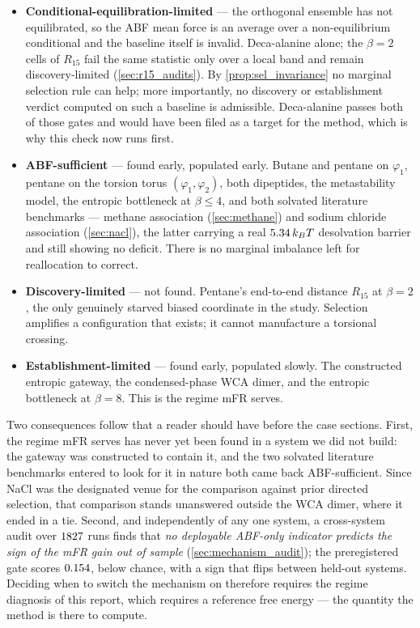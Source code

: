 \begin{itemize}
  \item \textbf{Conditional-equilibration-limited} --- the orthogonal ensemble has not
  equilibrated, so the ABF mean force is an average over a non-equilibrium conditional and the
  baseline itself is invalid. Deca-alanine alone; the $\beta=2$ cells of $R_{15}$ fail the
  same statistic only over a local band and remain discovery-limited (\cref{sec:r15_audits}).
  By
  \cref{prop:sel_invariance} no marginal selection rule can help; more importantly, no
  discovery or establishment verdict computed on such a baseline is admissible. Deca-alanine
  passes both of those gates and would have been filed as a target for the method, which is
  why this check now runs first.
  \item \textbf{ABF-sufficient} --- found early, populated early. Butane and pentane on
  $\varphi_1$, pentane on the torsion torus $(\varphi_1,\varphi_2)$, both dipeptides, the
  metastability model, the entropic bottleneck at $\beta\le4$, and both solvated
  literature benchmarks --- methane association (\cref{sec:methane}) and sodium chloride
  association (\cref{sec:nacl}), the latter carrying a real $5.34\,k_BT$ desolvation
  barrier and still showing no deficit. There is no marginal
  imbalance left for reallocation to correct.
  \item \textbf{Discovery-limited} --- not found. Pentane's end-to-end distance $R_{15}$ at
  $\beta=2$, the only genuinely starved biased coordinate in the study. Selection amplifies a
  configuration that exists; it cannot manufacture a torsional crossing.
  \item \textbf{Establishment-limited} --- found early, populated slowly. The constructed
  entropic gateway, the condensed-phase WCA dimer, and the entropic bottleneck at $\beta=8$.
  This is the regime mFR serves.
\end{itemize}

Two consequences follow that a reader should have before the case sections. First, the regime
mFR serves has never yet been found in a system we did not build: the gateway was constructed to
contain it, and the two solvated literature benchmarks entered to look for it in nature both
came back ABF-sufficient. Since NaCl was the designated venue for the comparison against prior
directed selection, that comparison stands unanswered outside the WCA dimer, where it ended in a
tie. Second, and independently of any one system, a cross-system audit over $1827$ runs finds
that \emph{no deployable ABF-only indicator predicts the sign of the mFR gain out of sample}
(\cref{sec:mechanism_audit}); the preregistered gate scores $0.154$, below chance, with a
sign that flips between held-out systems. Deciding when to switch the mechanism on therefore
requires the regime diagnosis of this report, which requires a reference free energy --- the
quantity the method is there to compute.

